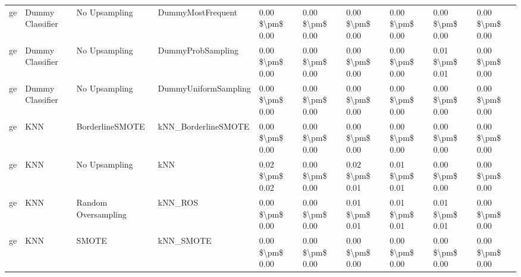 \begin{tabular}{llllllllll}
      ge &                Dummy Classifier &                 No Upsampling &                            DummyMostFrequent & 0.00 \$\textbackslash pm\$ 0.00 &           0.00 \$\textbackslash pm\$ 0.00 &       0.00 \$\textbackslash pm\$ 0.00 &        0.00 \$\textbackslash pm\$ 0.00 &                         0.00 \$\textbackslash pm\$ 0.00 &     0.00 \$\textbackslash pm\$ 0.00 \\
      ge &                Dummy Classifier &                 No Upsampling &                            DummyProbSampling & 0.00 \$\textbackslash pm\$ 0.00 &           0.00 \$\textbackslash pm\$ 0.00 &       0.00 \$\textbackslash pm\$ 0.00 &        0.00 \$\textbackslash pm\$ 0.00 &                         0.01 \$\textbackslash pm\$ 0.01 &     0.00 \$\textbackslash pm\$ 0.00 \\
      ge &                Dummy Classifier &                 No Upsampling &                         DummyUniformSampling & 0.00 \$\textbackslash pm\$ 0.00 &           0.00 \$\textbackslash pm\$ 0.00 &       0.00 \$\textbackslash pm\$ 0.00 &        0.00 \$\textbackslash pm\$ 0.00 &                         0.00 \$\textbackslash pm\$ 0.00 &     0.00 \$\textbackslash pm\$ 0.00 \\
      ge &                             KNN &               BorderlineSMOTE &                          kNN\_BorderlineSMOTE & 0.00 \$\textbackslash pm\$ 0.00 &           0.00 \$\textbackslash pm\$ 0.00 &       0.00 \$\textbackslash pm\$ 0.00 &        0.00 \$\textbackslash pm\$ 0.00 &                         0.00 \$\textbackslash pm\$ 0.00 &     0.00 \$\textbackslash pm\$ 0.00 \\
      ge &                             KNN &                 No Upsampling &                                          kNN & 0.02 \$\textbackslash pm\$ 0.02 &           0.00 \$\textbackslash pm\$ 0.00 &       0.02 \$\textbackslash pm\$ 0.01 &        0.01 \$\textbackslash pm\$ 0.01 &                         0.00 \$\textbackslash pm\$ 0.00 &     0.00 \$\textbackslash pm\$ 0.00 \\
      ge &                             KNN &           Random Oversampling &                                      kNN\_ROS & 0.00 \$\textbackslash pm\$ 0.00 &           0.00 \$\textbackslash pm\$ 0.00 &       0.01 \$\textbackslash pm\$ 0.01 &        0.01 \$\textbackslash pm\$ 0.01 &                         0.01 \$\textbackslash pm\$ 0.01 &     0.00 \$\textbackslash pm\$ 0.00 \\
      ge &                             KNN &                         SMOTE &                                    kNN\_SMOTE & 0.00 \$\textbackslash pm\$ 0.00 &           0.00 \$\textbackslash pm\$ 0.00 &       0.00 \$\textbackslash pm\$ 0.00 &        0.00 \$\textbackslash pm\$ 0.00 &                         0.00 \$\textbackslash pm\$ 0.00 &     0.00 \$\textbackslash pm\$ 0.00 \\

\end{tabular}
